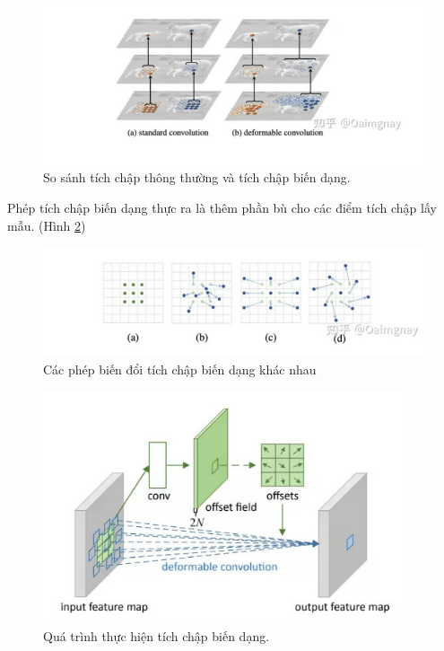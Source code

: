 \documentclass[12pt,a4paper,openany,oneside]{report}
\begin{document}
\begin{figure}[ht!]
	\begin{center}
		\includegraphics[width=445px]{./compare_normal_with_deformable_convolution.jpg}
		\caption{So sánh tích chập thông thường và tích chập biến dạng.}
		\label{so_sanh_tich_chap_thong_thuong_deformable}
	\end{center}
\end{figure} 

Phép tích chập biến dạng thực ra là thêm phần bù cho các điểm tích chập lấy mẫu. (Hình \ref{offset_deformable_convolution})

\begin{figure}[ht!]
	\begin{center}
		\includegraphics[width=445px]{./feature_offset_type.jpg}
		\caption{Các phép biến đổi tích chập biến dạng khác nhau
		}
		\label{offset_deformable_convolution}
	\end{center}
\end{figure} 

\begin{figure}[ht!]
	\begin{center}
		\includegraphics[width=400px]{./deformable_process.jpg}
		\caption{Quá trình thực hiện tích chập biến dạng.}
		\label{deformable_process}
	\end{center}
\end{figure} 
\end{document}
